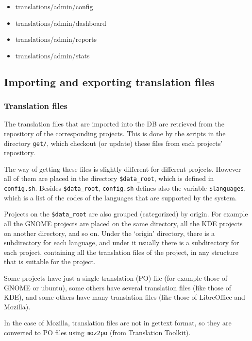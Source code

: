\documentclass[11pt]{article}
\begin{document}
\begin{itemize}
\item translations/admin/config
\item translations/admin/dashboard
\item translations/admin/reports
\item translations/admin/stats
\end{itemize}
\subsection{Importing and exporting translation files}
\label{sec-8.4}


\subsubsection{Translation files}
\label{sec-8.4.1}


    The translation files that are imported into the DB are retrieved
    from the repository of the corresponding projects. This is done by
    the scripts in the directory \texttt{get/}, which checkout (or update)
    these files from each projects' repository.

    The way of getting these files is slightly different for different
    projects. However all of them are placed in the directory
    \texttt{\$data\_root}, which is defined in \texttt{config.sh}. Besides \texttt{\$data\_root},
    \texttt{config.sh} defines also the variable \texttt{\$languages}, which is a list
    of the codes of the languages that are supported by the system.
    
    Projects on the \texttt{\$data\_root} are also grouped (categorized) by
    origin.  For example all the GNOME projects are placed on the same
    directory, all the KDE projects on another directory, and so on.
    Under the `origin' directory, there is a subdirectory for each
    language, and under it usually there is a subdirectory for each
    project, containing all the translation files of the project, in
    any structure that is suitable for the project.

    Some projects have just a single translation (PO) file (for example
    those of GNOME or ubuntu), some others have several translation
    files (like those of KDE), and some others have many translation
    files (like those of LibreOffice and Mozilla).

    In the case of Mozilla, translation files are not in gettext format,
    so they are converted to PO files using \texttt{moz2po} (from Translation
    Toolkit).
\end{document}
